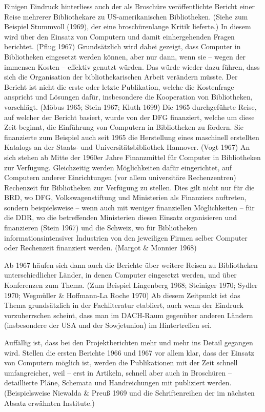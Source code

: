 \documentclass[a4paper,
fontsize=11pt,
oneside,
numbers=noperiodatend,
parskip=half-,
bibliography=totoc,
final
]{scrartcl}
\begin{document}
Einigen Eindruck hinterliess auch der als Broschüre veröffentlichte
Bericht einer Reise mehrerer Bibliothekare zu US-amerikanischen
Bibliotheken. (Siehe zum Beispiel Stummvoll (1969), der eine
broschürenlange Kritik lieferte.) In diesem wird über den Einsatz von
Computern und damit einhergehenden Fragen berichtet. (Pflug 1967)
Grundsätzlich wird dabei gezeigt, dass Computer in Bibliotheken
eingesetzt werden können, aber nur dann, wenn sie -- wegen der immensen
Kosten -- effektiv genutzt würden. Das würde wieder dazu führen, dass
sich die Organisation der bibliothekarischen Arbeit verändern müsste.
Der Bericht ist nicht die erste oder letzte Publikation, welche die
Kostenfrage anspricht und Lösungen dafür, insbesondere die Kooperation
von Bibliotheken, vorschlägt. (Möbus 1965; Stein 1967; Kluth 1699) Die
1965 durchgeführte Reise, auf welcher der Bericht basiert, wurde von der
DFG finanziert, welche um diese Zeit beginnt, die Einführung von
Computern in Bibliotheken zu fördern. Sie finanzierte zum Beispiel auch
seit 1965 die Herstellung eines maschinell erstellten Katalogs an der
Staats- und Universitätsbibliothek Hannover. (Vogt 1967) An sich stehen
ab Mitte der 1960er Jahre Finanzmittel für Computer in Bibliotheken zur
Verfügung. Gleichzeitig werden Möglichkeiten dafür eingerichtet, auf
Computern anderer Einrichtungen (vor allem universitäre Rechenzentren)
Rechenzeit für Bibliotheken zur Verfügung zu stellen. Dies gilt nicht
nur für die BRD, wo DFG, Volkswagenstiftung und Ministerien als
Finanziers auftreten, sondern beispielsweise -- wenn auch mit weniger
finanziellen Möglichkeiten -- für die DDR, wo die betreffenden
Ministerien diesen Einsatz organisieren und finanzieren (Stein 1967) und
die Schweiz, wo für Bibliotheken informationsintensiver Industrien von
den jeweiligen Firmen selber Computer oder Rechenzeit finanziert werden.
(Margot \& Monnier 1968)

Ab 1967 häufen sich dann auch die Berichte über weitere Reisen zu
Bibliotheken unterschiedlicher Länder, in denen Computer eingesetzt
werden, und über Konferenzen zum Thema. (Zum Beispiel Lingenberg 1968;
Steiniger 1970; Sydler 1970; Wegmüller \& Hoffmann-La Roche 1970) Ab
diesem Zeitpunkt ist das Thema grundsätzlich in der Fachliteratur
etabliert, auch wenn der Eindruck vorzuherrschen scheint, dass man im
DACH-Raum gegenüber anderen Ländern (insbesondere der USA und der
Sowjetunion) im Hintertreffen sei.

Auffällig ist, dass bei den Projektberichten mehr und mehr ins Detail
gegangen wird. Stellen die ersten Berichte 1966 und 1967 vor allem klar,
dass der Einsatz von Computern möglich ist, werden die Publikationen mit
der Zeit schnell umfangreicher, weil -- erst in Artikeln, schnell aber
auch in Broschüren -- detaillierte Pläne, Schemata und Handreichungen
mit publiziert werden. (Beispielsweise Niewalda \& Preuß 1969 und die
Schriftenreihen der im nächsten Absatz erwähnten Institute.)
\end{document}
